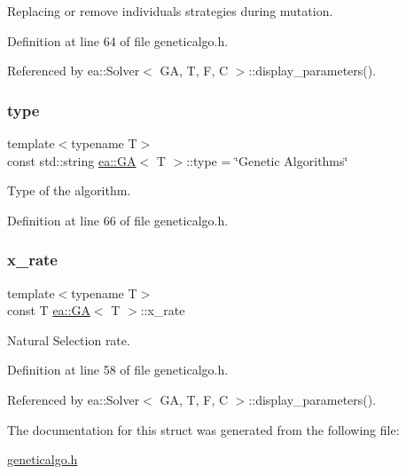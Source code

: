 Replacing or remove individuals strategies during mutation. 



Definition at line 64 of file geneticalgo.\+h.



Referenced by ea\+::\+Solver$<$ G\+A, T, F, C $>$\+::display\+\_\+parameters().

\mbox{\label{structea_1_1_g_a_a513eb50f77399d52e1aebf7d200b44c8}} 
\subsubsection{\texorpdfstring{type}{type}}
{\footnotesize\ttfamily template$<$typename T$>$ \\
const std\+::string \hyperlink{structea_1_1_g_a}{ea\+::\+GA}$<$ T $>$\+::type = \char`\"{}Genetic Algorithms\char`\"{}}



Type of the algorithm. 



Definition at line 66 of file geneticalgo.\+h.

\mbox{\label{structea_1_1_g_a_ab72149b9ca39f385432e5310f4ae5ed6}} 
\subsubsection{\texorpdfstring{x\+\_\+rate}{x\_rate}}
{\footnotesize\ttfamily template$<$typename T$>$ \\
const T \hyperlink{structea_1_1_g_a}{ea\+::\+GA}$<$ T $>$\+::x\+\_\+rate}



Natural Selection rate. 



Definition at line 58 of file geneticalgo.\+h.



Referenced by ea\+::\+Solver$<$ G\+A, T, F, C $>$\+::display\+\_\+parameters().



The documentation for this struct was generated from the following file\+:\begin{DoxyCompactItemize}
\item 
\hyperlink{geneticalgo_8h}{geneticalgo.\+h}\end{DoxyCompactItemize}
